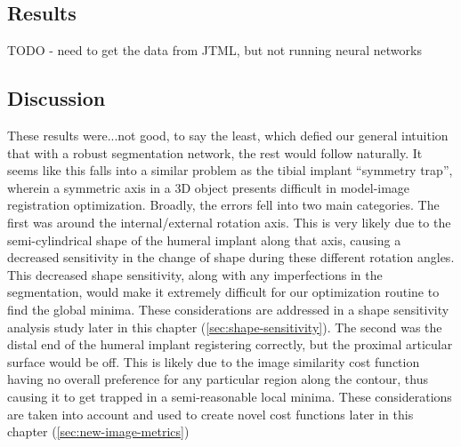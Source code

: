 \subsection{Results}
{\Huge TODO - need to get the data from JTML, but not running neural networks}
\subsection{Discussion}
These results were...not good, to say the least, which defied our general intuition that with a robust segmentation network, the rest would follow naturally.
It seems like this falls into a similar problem as the tibial implant ``symmetry trap'', wherein a symmetric axis in a 3D object presents difficult in model-image registration optimization.
Broadly, the errors fell into two main categories.
The first was around the internal/external rotation axis.
This is very likely due to the semi-cylindrical shape of the humeral implant along that axis, causing a decreased sensitivity in the change of shape during these different rotation angles.
This decreased shape sensitivity, along with any imperfections in the segmentation, would make it extremely difficult for our optimization routine to find the global minima.
These considerations are addressed in a shape sensitivity analysis study later in this chapter (\cref{sec:shape-sensitivity}).
The second was the distal end of the humeral implant registering correctly, but the proximal articular surface would be off.
This is likely due to the image similarity cost function having no overall preference for any particular region along the contour, thus causing it to get trapped in a semi-reasonable local minima.
These considerations are taken into account and used to create novel cost functions later in this chapter (\cref{sec:new-image-metrics})

